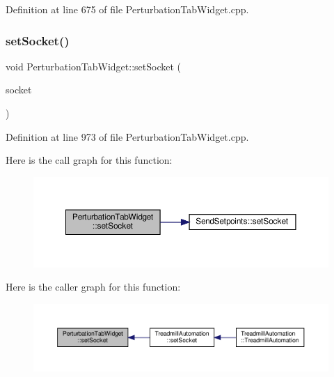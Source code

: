 Definition at line 675 of file Perturbation\+Tab\+Widget.\+cpp.

\mbox{\label{class_perturbation_tab_widget_a61e4292beb7e59e386bf73a724b2b308}} 
\subsubsection{\texorpdfstring{set\+Socket()}{setSocket()}}
{\footnotesize\ttfamily void Perturbation\+Tab\+Widget\+::set\+Socket (\begin{DoxyParamCaption}\item[{Q\+Abstract\+Socket $\ast$}]{socket }\end{DoxyParamCaption})}



Definition at line 973 of file Perturbation\+Tab\+Widget.\+cpp.

Here is the call graph for this function\+:
\nopagebreak
\begin{figure}[H]
\begin{center}
\leavevmode
\includegraphics[width=350pt]{class_perturbation_tab_widget_a61e4292beb7e59e386bf73a724b2b308_cgraph}
\end{center}
\end{figure}
Here is the caller graph for this function\+:
\nopagebreak
\begin{figure}[H]
\begin{center}
\leavevmode
\includegraphics[width=350pt]{class_perturbation_tab_widget_a61e4292beb7e59e386bf73a724b2b308_icgraph}
\end{center}
\end{figure}
\mbox{\label{class_perturbation_tab_widget_af54ddc95a7f3738b9083ff9ca5934d22}} 
